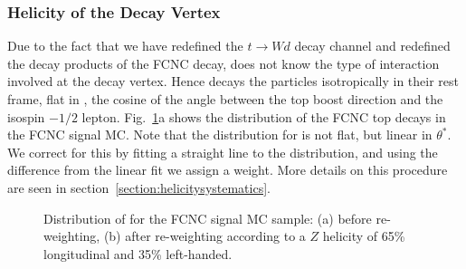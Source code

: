 

\subsubsection{Helicity of the Decay Vertex}
Due to the fact that we have redefined the $t \rightarrow W d$ decay
channel and redefined the decay products of the FCNC decay, \pyth
does not know the type of interaction involved at the decay
vertex. Hence \pyth decays the particles isotropically in their rest
frame, \ie flat in \costh, the cosine of the angle between the top
boost direction and the isospin $-1/2$ lepton.  Fig.~\ref{fig:costheta}a 
shows the \costh distribution of the FCNC top decays in the FCNC signal MC.
Note that the distribution for \costh is not flat, but linear in $\theta^*$.
We correct for this by fitting a straight line to the distribution, and 
using the difference from the linear fit we assign a weight. More details 
on this procedure are seen in section~\ref{section:helicitysystematics}.

\begin{figure}[t]
  \begin{center}
\end{center}
  \caption{Distribution of \costh for the
    FCNC signal MC sample: (a) before re-weighting, (b) after re-weighting
    according to a $Z$ helicity of 65\% longitudinal and 35\%
    left-handed.}
  \label{fig:costheta}
\end{figure}

